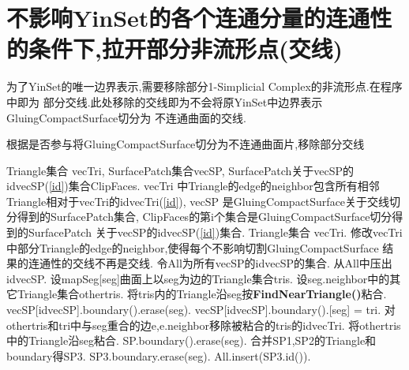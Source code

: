 \documentclass[a4paper]{book}
\renewcommand{\algorithmicrequire}{\textbf{输入:}}
\renewcommand{\algorithmicensure}{\textbf{输出:}}
\renewcommand{\algorithmicrequire}{\textbf{Input : }}
\renewcommand{\algorithmicrequire}{\textbf{Precondition : }}
\renewcommand{\algorithmicensure}{\textbf{Output : }}
\renewcommand{\algorithmicensure}{\textbf{Postcondition : }}
\numberwithin{equation}{chapter}
\theoremstyle{definition}
\begin{document}
\section{不影响YinSet的各个连通分量的连通性的条件下,拉开部分非流形点(交线)}
为了YinSet的唯一边界表示,需要移除部分1-Simplicial Complex的非流形点.在程序中即为
部分交线.此处移除的交线即为不会将原YinSet中边界表示GluingCompactSurface切分为
不连通曲面的交线.

\begin{algorithm}\label{ReduceIntersection}
	\caption{根据是否参与将GluingCompactSurface切分为不连通曲面片,移除部分交线}
	\begin{algorithmic}[1]
		\renewcommand{\algorithmicrequire}{\textbf{Input : }}
		\Require Triangle集合 vecTri, SurfacePatch集合vecSP,
        SurfacePatch关于vecSP的idvecSP(\ref{id})集合ClipFaces.
		\renewcommand{\algorithmicrequire}{\textbf{Precondition : }}
		\Require vecTri 中Triangle的edge的neighbor包含所有相邻Triangle相对于vecTri的idvecTri(\ref{id}),
        vecSP 是GluingCompactSurface关于交线切分得到的SurfacePatch集合,
        ClipFaces的第i个集合是GluingCompactSurface切分得到的SurfacePatch 关于vecSP的idvecSP(\ref{id})集合.
		\renewcommand{\algorithmicensure}{\textbf{Output : }}
        \Ensure Triangle集合 vecTri.
		\renewcommand{\algorithmicensure}{\textbf{Postcondition : }}
		\Ensure 修改vecTri中部分Triangle的edge的neighbor,使得每个不影响切割GluingCompactSurface
        结果的连通性的交线不再是交线.
        \State 令All为所有vecSP的idvecSP的集合.
        \State 从All中压出idvecSP.
        \State 设mapSeg[seg]曲面上以seg为边的Triangle集合tris.
        \State 设seg.neighbor中的其它Triangle集合othertris.
        \State 将tris内的Triangle沿seg按\textbf{FindNearTriangle()}粘合.
        \State vecSP[idvecSP].boundary().erase(seg).
        \State vecSP[idvecSP].boundary().[seg] = tri.
        \EndIf
        \State 对othertris和tri中与seg重合的边e,e.neighbor移除被粘合的tris的idvecTri.
        \State 将othertris中的Triangle沿seg粘合.
        \State SP.boundary().erase(seg).
        \State 合并SP1,SP2的Triangle和boundary得SP3.
        \State SP3.boundary.erase(seg).
        \State All.insert(SP3.id()).
        \EndIf
        \EndIf
        \EndIf
        \EndFor
        \EndWhile
        \EndFunction
	\end{algorithmic}
\end{algorithm}
\end{document}
